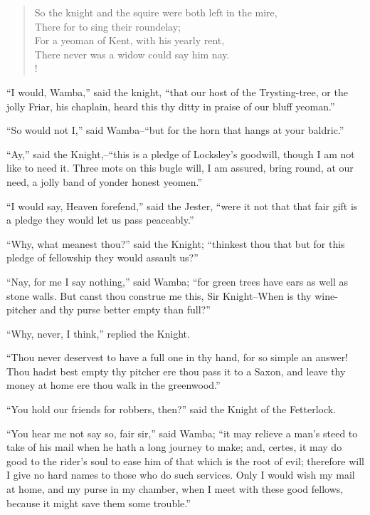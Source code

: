 \begin{verse}

So the knight and the squire were both left in the mire,\\
There for to sing their roundelay;\\
For a yeoman of Kent, with his yearly rent,\\
There never was a widow could say him nay.\\!
\end{verse}

``I would, Wamba,'' said the knight, ``that our host of the
Trysting-tree, or the jolly Friar, his chaplain, heard this thy ditty in
praise of our bluff yeoman.''

``So would not I,'' said Wamba--``but for the horn that hangs at your
baldric.''

``Ay,'' said the Knight,--``this is a pledge of Locksley's goodwill,
though I am not like to need it. Three mots on this bugle will, I am
assured, bring round, at our need, a jolly band of yonder honest
yeomen.''

``I would say, Heaven forefend,'' said the Jester, ``were it not that
that fair gift is a pledge they would let us pass peaceably.''

``Why, what meanest thou?'' said the Knight; ``thinkest thou that but
for this pledge of fellowship they would assault us?''

``Nay, for me I say nothing,'' said Wamba; ``for green trees have ears
as well as stone walls. But canst thou construe me this, Sir
Knight--When is thy wine-pitcher and thy purse better empty than full?''

``Why, never, I think,'' replied the Knight.

``Thou never deservest to have a full one in thy hand, for so simple an
answer! Thou hadst best empty thy pitcher ere thou pass it to a Saxon,
and leave thy money at home ere thou walk in the greenwood.''

``You hold our friends for robbers, then?'' said the Knight of the
Fetterlock.

``You hear me not say so, fair sir,'' said Wamba; ``it may relieve a
man's steed to take of his mail when he hath a long journey to make;
and, certes, it may do good to the rider's soul to ease him of that
which is the root of evil; therefore will I give no hard names to those
who do such services. Only I would wish my mail at home, and my purse in
my chamber, when I meet with these good fellows, because it might save
them some trouble.''

